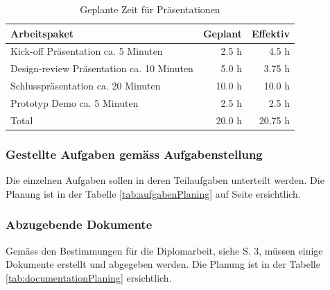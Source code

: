   \begin{table}[ht]
    \sffamily 
    \begin{center}
      \begin{tabular}{p{9cm}rr}
        \toprule
        \textbf{Arbeitspaket} & \textbf{Geplant} & \textbf{Effektiv} \\
        \midrule
        Kick-off Präsentation ca. 5 Minuten &
        2.5 h &
        4.5 h\\
        Design-review Präsentation ca. 10 Minuten &
        5.0 h &
        3.75 h\\
        Schlusspräsentation ca. 20 Minuten &
        10.0 h &
        10.0 h\\
        Prototyp Demo ca. 5 Minuten &
        2.5 h &
        2.5 h\\
        \bottomrule
        Total &
        20.0 h &
        20.75 h\\
        \bottomrule
      \end{tabular}
      \caption{Geplante Zeit für Präsentationen}
      \label{tab:presentationPlaning}
    \end{center}
  \end{table}
  
  \subsubsection{Gestellte Aufgaben gemäss Aufgabenstellung}
  
  Die einzelnen Aufgaben sollen in deren Teilaufgaben unterteilt werden. Die
  Planung ist in der Tabelle \ref{tab:aufgabenPlaning} auf Seite
  \pageref{tab:aufgabenPlaning} ersichtlich.
  
  \subsubsection{Abzugebende Dokumente}
  
  Gemäss den Bestimmungen für die Diplomarbeit, siehe \cite{hsz_reglement} S. 3,
  müssen einige Dokumente erstellt und abgegeben werden. Die Planung ist in der
  Tabelle \ref{tab:documentationPlaning} ersichtlich.
  \newline
  
